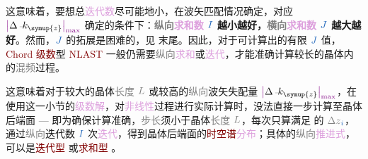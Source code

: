 这意味着，要想总\textcolor{Plum}{迭代数}尽可能地小，在\textcolor{PineGreen}{波矢匹配}情况确定，对应 $\textcolor{Plum}{\left|\textcolor{black}{\Delta \xint{\begin{smallmatrix} ~ \\ {}^{}_{\mathcolor{gray}{-}} \\ ~ \end{smallmatrix}}{15}{k}_{\symup{z}}}\right|_{\max}}$ 确定的条件下：\textbf{\textcolor{gray}{纵向}\textcolor{Plum}{求和数} $\textcolor{NavyBlue}{I}$ 越小越好，\textcolor{gray}{横向}\textcolor{Plum}{求和数} $\textcolor{NavyBlue}{J}$ 越大越好}。然而，$\textcolor{NavyBlue}{J}$ 的拓展是困难的，见  末尾。因此，对于可计算出的有限 $\textcolor{NavyBlue}{J}$ 值，\textcolor{Maroon}{Chord 级数}型 \textcolor{Maroon}{NLAST} 一般仍需要\textcolor{gray}{纵向}\textcolor{Plum}{求和}或\textcolor{Plum}{迭代}，才能准确计算较长的\textcolor{PineGreen}{晶体}内的\textcolor{gray}{混频}过程。

这意味着对于较大的\textcolor{PineGreen}{晶体}\textcolor{gray}{长度} $ \mathcolor{gray}{L}$ 或较高的\textcolor{gray}{纵向}\textcolor{PineGreen}{波矢失配量} $\textcolor{Plum}{\left|\textcolor{black}{\Delta \xint{\begin{smallmatrix} ~ \\ {}^{}_{\mathcolor{gray}{-}} \\ ~ \end{smallmatrix}}{15}{k}_{\symup{z}}}\right|_{\max}}$，在使用这一小节的\textcolor{Plum}{级数}\textcolor{Plum}{解}，对\textcolor{Plum}{非线性}\textcolor{NavyBlue}{过程}进行实际计算时，没法直接一步计算至\textcolor{PineGreen}{晶体}后端面 --- 即为确保计算准确，\textcolor{gray}{步长}须小于\textcolor{PineGreen}{晶体}\textcolor{gray}{长度} $\mathcolor{gray}{L}$，每次只算满足  的 ${\mathcolor{gray}{\Delta z}}_{\textcolor{NavyBlue}{i}}$，通过\textcolor{gray}{纵向}\textcolor{NavyBlue}{迭代数} $\textcolor{NavyBlue}{I}$ 次\textcolor{Plum}{迭代}，得到\textcolor{PineGreen}{晶体}后端面的\textcolor{Maroon}{时空谱}\textcolor{Plum}{分布}；具体的\textcolor{gray}{纵向}\textcolor{Plum}{推进式}，可以是\textcolor{Maroon}{迭代型}  或\textcolor{Maroon}{求和型} 。

